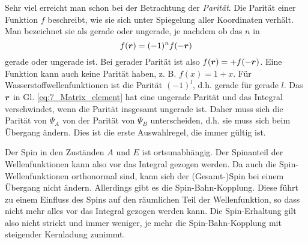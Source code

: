 Sehr viel erreicht man schon bei der Betrachtung der  \emph{Parität}. Die Parität einer Funktion $f$ beschreibt, wie sie sich unter Spiegelung aller Koordinaten verhält. Man bezeichnet sie als gerade oder ungerade, je nachdem ob das $n$ in 
\begin{equation}
    f(\boldsymbol{r}) = (-1)^n f(- \boldsymbol{r})
\end{equation}
gerade oder ungerade ist. Bei gerader Parität ist also $f(\boldsymbol{r}) = + f(- \boldsymbol{r}) $.
Eine Funktion kann auch keine Parität haben, z. B. $f(x) = 1 + x$. Für Wasserstoffwellenfunktionen ist die Parität $(-1)^l$, d.h. gerade für gerade $l$. Das $\boldsymbol{r}$ in Gl. \ref{eq:7_Matrix_element} hat eine ungerade Parität und das Integral verschwindet, wenn die Parität insgesamt ungerade ist. Daher muss sich die Parität von $\Psi_A$ von der Parität von $\Psi_B$ unterscheiden, d.h. sie muss sich beim Übergang ändern. Dies ist die erste Auswahlregel, die immer gültig ist.

Der Spin in den Zuständen $A$ und $E$ ist ortsunabhängig. Der Spinanteil der Wellenfunktionen kann also vor das Integral gezogen werden. Da auch die Spin-Wellenfunktionen orthonormal sind, kann sich der (Gesamt-)Spin bei einem Übergang nicht ändern. Allerdings gibt es die Spin-Bahn-Kopplung. Diese führt zu einem Einfluss des Spins auf den räumlichen Teil der Wellenfunktion, so dass nicht mehr alles vor das Integral gezogen werden kann. Die Spin-Erhaltung gilt also nicht strickt und immer weniger, je mehr die Spin-Bahn-Kopplung mit steigender Kernladung zunimmt.


